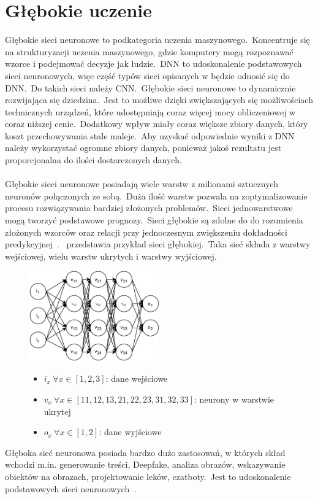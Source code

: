 \section{Głębokie uczenie}
\label{sec:deeplearn}
Głębokie sieci neuronowe  to podkategoria uczenia maszynowego.\ Koncentruje się na strukturyzacji uczenia maszynowego, gdzie komputery mogą rozpoznawać wzorce i podejmować decyzje jak ludzie.\ DNN to udoskonalenie podstawowych sieci neuronowych, więc część typów sieci opisanych w  będzie odnosić się do DNN.\ Do takich sieci należy CNN.\ Głębokie sieci neuronowe to dynamicznie rozwijająca się dziedzina.\ Jest to możliwe dzięki zwiększających się możliwościach technicznych urządzeń, które udostępniają coraz więcej mocy obliczeniowej w coraz niższej cenie.\ Dodatkowy wpływ miały coraz większe zbiory danych, który koszt przechowywania stale maleje.\ Aby uzyskać odpowiednie wyniki z DNN należy wykorzystać ogromne zbiory danych, ponieważ jakoś rezultatu jest proporcjonalna do ilości dostarczonych danych.
\\ \\
Głębokie sieci neuronowe posiadają wiele warstw z milionami sztucznych neuronów połączonych ze sobą.\ Duża ilość warstw pozwala na zoptymalizowanie procesu rozwiązywania bardziej złożonych problemów.\ Sieci jednowarstwowe mogą tworzyć podstawowe prognozy.\ Sieci głębokie są zdolne do do rozumienia złożonych wzorców oraz relacji przy jednoczesnym zwiększeniu dokładności predykcyjnej~\cite{Crabtree}.\  przedstawia przykład sieci głębokiej.\ Taka sieć składa z warstwy wejściowej, wielu warstw ukrytych i warstwy wyjściowej.

\begin{figure}[H]
    \centering
    \includegraphics[width=0.5\textwidth]{images/deep-neural-network}
    \begin{itemize}
        \item[] $i_x \  \forall x \in [1, 2, 3]$: dane wejściowe
        \item[] $v_x \ \forall x \in [11, 12, 13, 21, 22, 23, 31, 32, 33]$: neurony w warstwie ukrytej
        \item[] $o_x \ \forall x \in [1, 2]$: dane wyjściowe
    \end{itemize}
    \label{fig:deep-learn}
\end{figure}

Głęboka sieć neuronowa posiada bardzo dużo zastosowań, w których skład wchodzi m.in. generowanie treści, Deepfake, analiza obrazów, wskazywanie obiektów na obrazach, projektowanie leków, czatboty.\ Jest to udoskonalenie podstawowych sieci neuronowych~\cite{MicrosoftDeep2023}.